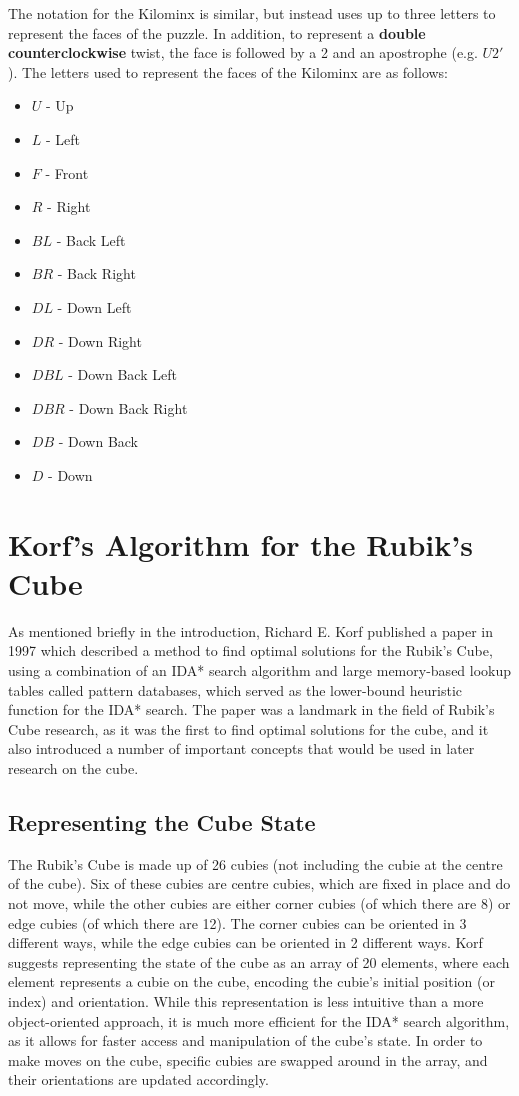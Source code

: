 The notation for the Kilominx is similar, but instead uses up to three letters to represent the faces of the puzzle. In addition, to represent a \textbf{double counterclockwise} twist, the face is followed by a 2 and an apostrophe (e.g. $U2'$). The letters used to represent the faces of the Kilominx are as follows:
\begin{itemize}
    \item $U$ - Up
    \item $L$ - Left
    \item $F$ - Front
    \item $R$ - Right
    \item $BL$ - Back Left
    \item $BR$ - Back Right
    \item $DL$ - Down Left
    \item $DR$ - Down Right
    \item $DBL$ - Down Back Left
    \item $DBR$ - Down Back Right
    \item $DB$ - Down Back
    \item $D$ - Down
\end{itemize}

 

\section{Korf's Algorithm for the Rubik's Cube}
As mentioned briefly in the introduction, Richard E. Korf published a paper in 1997 \cite{korf} which described a method to find optimal solutions for the Rubik's Cube, using a combination of an IDA* search algorithm and large memory-based lookup tables called pattern databases, which served as the lower-bound heuristic function for the IDA* search. The paper was a landmark in the field of Rubik's Cube research, as it was the first to find optimal solutions for the cube, and it also introduced a number of important concepts that would be used in later research on the cube.

\subsection{Representing the Cube State}
The Rubik's Cube is made up of 26 cubies (not including the cubie at the centre of the cube). Six of these cubies are centre cubies, which are fixed in place and do not move, while the other cubies are either corner cubies (of which there are 8) or edge cubies (of which there are 12). The corner cubies can be oriented in 3 different ways, while the edge cubies can be oriented in 2 different ways. Korf suggests representing the state of the cube as an array of 20 elements, where each element represents a cubie on the cube, encoding the cubie's initial position (or index) and orientation. While this representation is less intuitive than a more object-oriented approach, it is much more efficient for the IDA* search algorithm, as it allows for faster access and manipulation of the cube's state. In order to make moves on the cube, specific cubies are swapped around in the array, and their orientations are updated accordingly.

